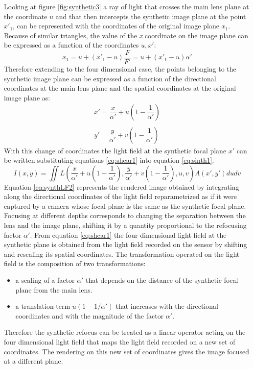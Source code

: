  Looking at figure \ref{fig:synthetic3} a ray of light that crosses the main lens plane at the coordinate $u$ and that then intercepts the synthetic image plane at the point $x'_1$, can be represented with the coordinates of the original image plane $x_1$. Because of similar triangles, the value of the \textit{x} coordinate on the image plane can be expressed as a function of the coordinates $ u, x'$:
 \begin{equation}
 	\label{eq:refocus11}
 	x_1 = u+(x'_1-u)\dfrac{F}{F'}=u+(x'_1-u) \alpha'
 \end{equation}
 Therefore extending to the four dimensional case, the points belonging to the synthetic image plane can be expressed as a function of the directional coordinates at the main lens plane and the spatial coordinates at the original image plane as:
 \begin{equation}
 \label{eq:shear1}
 \begin{matrix}
 x' = \dfrac{x}{ \alpha'}+u\left(1-\dfrac{1}{ \alpha'}\right) \\
 \\
 y' = \dfrac{y}{ \alpha'}+v\left(1-\dfrac{1}{ \alpha'}\right)
 \end{matrix} 
 \end{equation}
 With this change of coordinates the light field at the synthetic focal plane $x'$ can be written substituting equations \ref{eq:shear1} into equation \ref{eq:sinth1}.
 \begin{equation}
 \label{eq:synthLF2}
 I(x,y) =\iint L\left(\dfrac{x}{ \alpha'}+u\left(1-\dfrac{1}{ \alpha'}\right),\dfrac{y}{ \alpha'}+v\left(1-\dfrac{1}{ \alpha'}\right),u,v\right)A(x',y')dudv
 \end{equation}
 Equation \ref{eq:synthLF2} represents the rendered image obtained by integrating along the directional coordinates of the light field reparametrized as if it were captured by a camera whose focal plane is the same as the synthetic focal plane. \\
 Focusing at different depths corresponds to changing the separation between the lens and the image plane, shifting it by a quantity proportional to the refocusing factor $ \alpha'$. From equation \ref{eq:shear1} the four dimensional light field at the synthetic plane is obtained from the light field recorded on the sensor by shifting and rescaling its spatial coordinates. The transformation operated on the light field is the composition of two transformations:
 \begin{itemize}
 	\item a scaling of a factor $ \alpha'$ that depends on the distance of the synthetic focal plane from the main lens.
 	\item a translation term $u(1-1/ \alpha')$ that increases with the directional coordinates and with the magnitude of the factor $ \alpha'$.
 	 \end{itemize} 
 	 Therefore the synthetic refocus can be treated as a linear operator acting on the four dimensional light field that maps the light field recorded on a new set of coordinates. The rendering on this new set of coordinates gives the image focused at a different plane.
